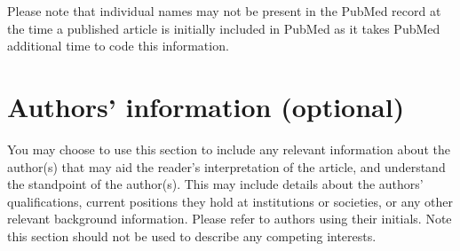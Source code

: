 \documentclass[a4paper,num-refs]{oup-contemporary}
\begin{document}
Please note that individual names may not be present in the PubMed record at the time a published article is initially included in PubMed as it takes PubMed additional time to code this information.

\section{Authors' information (optional)}

You may choose to use this section to include any relevant information about the author(s) that may aid the reader's interpretation of the article, and understand the standpoint of the author(s). This may include details about the authors' qualifications, current positions they hold at institutions or societies, or any other relevant background information. Please refer to authors using their initials. Note this section should not be used to describe any competing interests.




\end{document}
